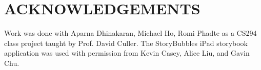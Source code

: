 \documentclass{sigchi}
\begin{document}

\section{ACKNOWLEDGEMENTS}
Work was done with Aparna Dhinakaran, Michael Ho, Romi Phadte as a CS294 class project taught by Prof. David Culler. 
The StoryBubbles iPad storybook application was used with permission from Kevin Casey, Alice Liu, and Gavin Chu. 

\balance


\end{document}
